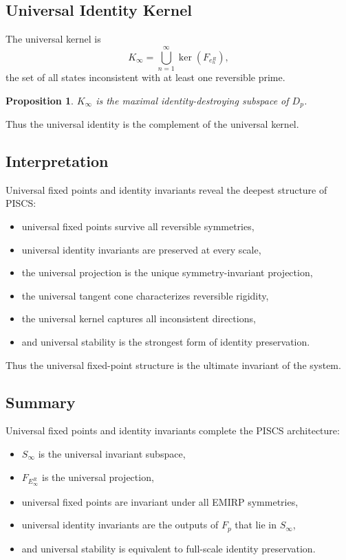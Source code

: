 \documentclass[11pt]{article}
\theoremstyle{definition}
\theoremstyle{plain}
\newtheorem{proposition}[definition]{Proposition}
\theoremstyle{remark}
\begin{document}
\subsection{Universal Identity Kernel}

The universal kernel is
\[
K_\infty = \bigcup_{n=1}^\infty \ker(F_{e_n^R}),
\]
the set of all states inconsistent with at least one reversible prime.

\begin{proposition}
$K_\infty$ is the maximal identity-destroying subspace of $D_p$.
\end{proposition}

Thus the universal identity is the complement of the universal kernel.

\subsection{Interpretation}

Universal fixed points and identity invariants reveal the deepest
structure of PISCS:

\begin{itemize}
    \item universal fixed points survive all reversible symmetries,
    \item universal identity invariants are preserved at every scale,
    \item the universal projection is the unique symmetry-invariant
    projection,
    \item the universal tangent cone characterizes reversible rigidity,
    \item the universal kernel captures all inconsistent directions,
    \item and universal stability is the strongest form of identity
    preservation.
\end{itemize}

Thus the universal fixed-point structure is the ultimate invariant of
the system.

\subsection{Summary}

Universal fixed points and identity invariants complete the PISCS
architecture:

\begin{itemize}
    \item $S_\infty$ is the universal invariant subspace,
    \item $F_{E_\infty^R}$ is the universal projection,
    \item universal fixed points are invariant under all EMIRP symmetries,
    \item universal identity invariants are the outputs of $F_p$ that lie
    in $S_\infty$,
    \item and universal stability is equivalent to full-scale identity
    preservation.
\end{itemize}
\end{document}
